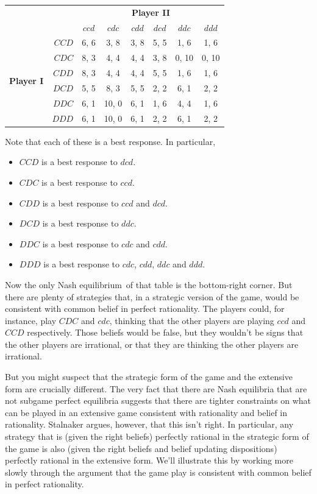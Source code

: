 \documentclass[openany]{book}
\newcommand{\eqm}{equilibrium}
\begin{document}
\begin{center}
\begin{tabular}{l r | c c c c c c}
& & \multicolumn{6}{c}{\textbf{Player II}} \\
& & $ccd$ & $cdc$ & $cdd$ & $dcd$ & $ddc$ & $ddd$ \\ \hline
\multirow{6}{*}{\textbf{Player I}} 
& $CCD$ & 6, 6 & 3, 8  & 3, 8  & 5, 5 & 1, 6 & 1, 6\\
& $CDC$ & 8, 3 & 4, 4  & 4, 4  & 3, 8 & 0, 10 & 0, 10\\
& $CDD$ & 8, 3 & 4, 4  & 4, 4  & 5, 5 & 1, 6 & 1, 6\\
& $DCD$ & 5, 5 & 8, 3  & 5, 5  & 2, 2 & 6, 1 & 2, 2\\
& $DDC$ & 6, 1 & 10, 0 & 6, 1 & 1, 6 & 4, 4 & 1, 6\\
& $DDD$ & 6, 1 & 10, 0 & 6, 1 & 2, 2 & 6, 1 & 2, 2\\
\end{tabular}
\end{center}
Note that each of these is a best response. In particular,
\begin{itemize}
\item $CCD$ is a best response to $dcd$.
\item $CDC$ is a best response to $ccd$.
\item $CDD$ is a best response to $ccd$ and $dcd$.
\item $DCD$ is a best response to $ddc$.
\item $DDC$ is a best response to $cdc$ and $cdd$.
\item $DDD$ is a best response to $cdc$, $cdd$, $ddc$ and $ddd$.
\end{itemize}
Now the only Nash \eqm\ of that table is the bottom-right corner. But there are plenty of strategies that, in a strategic version of the game, would be consistent with common belief in perfect rationality. The players could, for instance, play $CDC$ and $cdc$, thinking that the other players are playing $ccd$ and $CCD$ respectively. Those beliefs would be false, but they wouldn't be signs that the other players are irrational, or that they are thinking the other players are irrational.

But you might suspect that the strategic form of the game and the extensive form are crucially different. The very fact that there are Nash equilibria that are not subgame perfect equilibria suggests that there are tighter constraints on what can be played in an extensive game consistent with rationality and belief in rationality. Stalnaker argues, however, that this isn't right. In particular, any strategy that is (given the right beliefs) perfectly rational in the strategic form of the game is also (given the right beliefs and belief updating dispositions) perfectly rational in the extensive form. We'll illustrate this by working more slowly through the argument that the game play  is consistent with common belief in perfect rationality.
\end{document}
